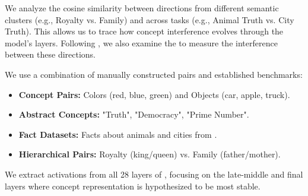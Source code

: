  We analyze the cosine similarity between directions from different semantic clusters (e.g., Royalty vs. Family) and across tasks (e.g., Animal Truth vs. City Truth). This allows us to trace how concept interference evolves through the model's layers. Following \citet{park2023linear}, we also examine the \cip to measure the interference between these directions.

 We use a combination of manually constructed pairs and established benchmarks:
\begin{itemize}[leftmargin=*,itemsep=0pt,topsep=0pt]
    \item \textbf{Concept Pairs:} Colors (red, blue, green) and Objects (car, apple, truck).
    \item \textbf{Abstract Concepts:} "Truth", "Democracy", "Prime Number".
    \item \textbf{Fact Datasets:} Facts about animals and cities from \triviaqa.
    \item \textbf{Hierarchical Pairs:} Royalty (king/queen) vs. Family (father/mother).
\end{itemize}
We extract activations from all 28 layers of \qwen, focusing on the late-middle and final layers where concept representation is hypothesized to be most stable.
